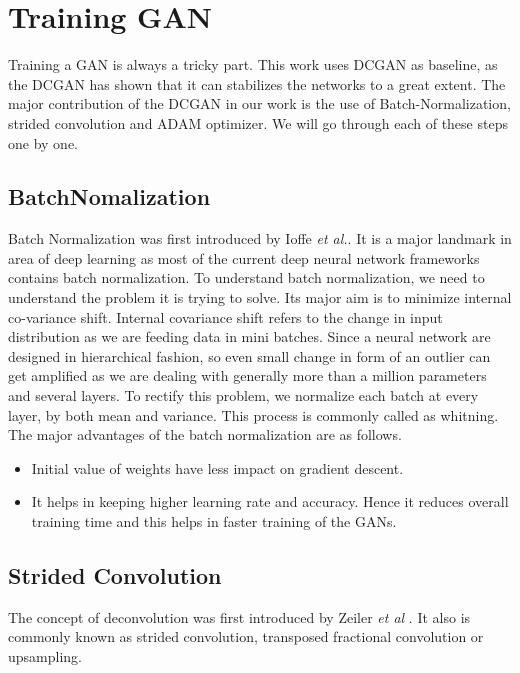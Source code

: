 \section{Training GAN}

Training a GAN is always a tricky part. This work uses DCGAN\cite{DCGAN} as baseline, as the DCGAN has shown that it can stabilizes the networks to a great extent. The major contribution of the DCGAN in our work is the use of Batch-Normalization, strided convolution and ADAM optimizer. We will go through each of these steps one by one.
\subsection{BatchNomalization}

Batch Normalization was first introduced by Ioffe \textit{et al.}\cite{BatchNorm}. It is a major landmark in area of deep learning as most of the current deep neural network frameworks contains batch normalization. 
To understand batch normalization, we need to understand the problem it is trying to solve. Its major aim is to minimize internal co-variance shift. Internal covariance shift refers to the change in input distribution as we are feeding data in mini batches. Since a neural network are designed in hierarchical fashion, so even small change in form of an outlier can get amplified as we are dealing with generally more than a million parameters and several layers. To rectify this problem, we normalize each batch at every layer, by both mean and variance. This process is commonly called as whitning. The major advantages of the batch normalization are as follows.
\begin{itemize}
    \item Initial value of weights have less impact on gradient descent.
    \item It helps in keeping higher learning rate and accuracy. Hence it reduces overall training time and this helps in faster training of the GANs.
\end{itemize}

\subsection{Strided Convolution}

The concept of deconvolution was first introduced by Zeiler \textit{et al} \cite{Deconv}. It also is commonly known as  strided convolution, transposed fractional convolution or upsampling.



